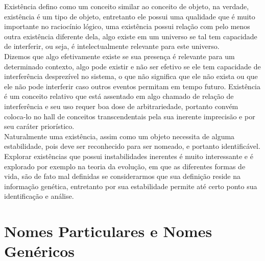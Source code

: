 \documentclass[10pt,a4paper]{report}
\begin{document}
% 
\hspace{\baselineskip}

Existência defino como um conceito similar ao conceito de objeto, na verdade, existência é um tipo de objeto, entretanto ele possui uma qualidade que é muito importante no raciocínio lógico, uma existência possui relação com pelo menos outra existência diferente dela, algo existe em um universo se tal tem capacidade de interferir, ou seja, é intelectualmente relevante para este universo.\\

Dizemos que algo efetivamente existe se sua presença é relevante para um determinado contexto, algo pode existir e não ser efetivo se ele tem capacidade de interferência desprezível no sistema, o que não significa que ele não exista ou que ele não pode interferir caso outros eventos permitam em tempo futuro. Existência é um conceito relativo que está assentado em algo chamado de relação de interferência e seu uso requer boa dose de arbitrariedade, portanto convém coloca-lo no hall de conceitos transcendentais pela sua inerente imprecisão e por seu caráter priorístico.\\

Naturalmente uma existência, assim como um objeto necessita de alguma estabilidade, pois deve ser reconhecido para ser nomeado, e portanto identificável. Explorar existências que possui instabilidades inerentes é muito interessante e é explorado por exemplo na teoria da evolução, em que as diferentes formas de vida, são de fato mal definidas se considerarmos que sua definição reside na informação genética, entretanto por sua estabilidade permite até certo ponto sua identificação e análise.


\section{Nomes Particulares e Nomes Genéricos}

\hspace{\baselineskip}
\end{document}
